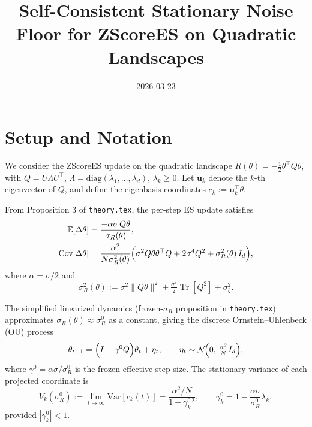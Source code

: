 \documentclass[american]{article}
\title{Self-Consistent Stationary Noise Floor for ZScoreES on Quadratic Landscapes}
\author{}
\date{2026-03-23}
\begin{document}
\maketitle

\section*{Setup and Notation}

We consider the ZScoreES update on the quadratic landscape
$R(\theta) = -\frac{1}{2}\theta^\top Q\theta$,
with $Q = U\Lambda U^\top$, $\Lambda = \mathrm{diag}(\lambda_1,\ldots,\lambda_d)$,
$\lambda_k \geq 0$.
Let $\mathbf{u}_k$ denote the $k$-th eigenvector of $Q$, and define the
eigenbasis coordinates $c_k := \mathbf{u}_k^\top\theta$.

From Proposition 3 of \texttt{theory.tex}, the per-step ES update satisfies
\begin{align}
    \mathbb{E}[\Delta\theta] &= \frac{-\alpha\sigma\, Q\theta}{\sigma_R(\theta)},
    \label{eq:mean-update}\\
    \mathrm{Cov}[\Delta\theta] &= \frac{\alpha^2}{N\sigma_R^2(\theta)}
        \Bigl(\sigma^2 Q\theta\theta^\top Q + 2\sigma^4 Q^2 + \sigma_R^2(\theta)\,I_d\Bigr),
    \label{eq:cov-update}
\end{align}
where $\alpha = \sigma/2$ and
\begin{equation}
    \sigma_R^2(\theta)
    := \sigma^2\|Q\theta\|^2 + \tfrac{\sigma^4}{2}\operatorname{Tr}[Q^2] + \sigma_\xi^2.
    \label{eq:sigmaR-def}
\end{equation}

The simplified linearized dynamics (frozen-$\sigma_R$ proposition in \texttt{theory.tex})
approximates $\sigma_R(\theta) \approx \sigma_R^0$ as a constant, giving the
discrete Ornstein--Uhlenbeck (OU) process
\begin{equation}
    \theta_{t+1} = \Bigl(I - \gamma^0 Q\Bigr)\theta_t + \eta_t,
    \qquad \eta_t \sim \mathcal{N}\!\Bigl(0,\,\tfrac{\alpha^2}{N}I_d\Bigr),
    \label{eq:frozen-ou}
\end{equation}
where $\gamma^0 = \alpha\sigma/\sigma_R^0$ is the frozen effective step size.
The stationary variance of each projected coordinate is
\begin{equation}
    V_k(\sigma_R^0)
    := \lim_{t\to\infty}\mathrm{Var}[c_k(t)]
    = \frac{\alpha^2/N}{1 - \gamma_k^{0\,2}},
    \qquad
    \gamma_k^0 = 1 - \frac{\alpha\sigma}{\sigma_R^0}\lambda_k,
    \label{eq:stationary-var-frozen}
\end{equation}
provided $|\gamma_k^0| < 1$.
\end{document}
